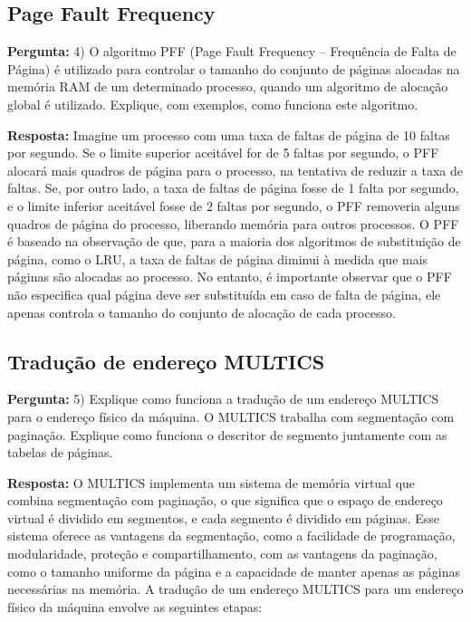 \documentclass{article}
\begin{document}
\subsection{Page Fault Frequency}

\textbf{Pergunta:} 4) O algoritmo PFF (Page Fault Frequency – Frequência de Falta de Página) é utilizado para controlar o tamanho do conjunto de páginas alocadas na memória RAM de um determinado processo, quando um algoritmo de alocação global é utilizado. Explique, com exemplos, como funciona este algoritmo.  \newline

\textbf{Resposta:} Imagine um processo com uma taxa de faltas de página de 10 faltas por segundo. Se o limite superior aceitável for de 5 faltas por segundo, o PFF alocará mais quadros de página para o processo, na tentativa de reduzir a taxa de faltas. Se, por outro lado, a taxa de faltas de página fosse de 1 falta por segundo, e o limite inferior aceitável fosse de 2 faltas por segundo, o PFF removeria alguns quadros de página do processo, liberando memória para outros processos.
O PFF é baseado na observação de que, para a maioria dos algoritmos de substituição de página, como o LRU, a taxa de faltas de página diminui à medida que mais páginas são alocadas ao processo. No entanto, é importante observar que o PFF não especifica qual página deve ser substituída em caso de falta de página, ele apenas controla o tamanho do conjunto de alocação de cada processo.

\subsection{Tradução de endereço MULTICS}

\textbf{Pergunta:} 5) Explique como funciona a tradução de um endereço MULTICS para o endereço físico da máquina. O MULTICS trabalha com segmentação com paginação. Explique como funciona o descritor de segmento juntamente com as tabelas de páginas. \textcite[p. 170]{tanenbaum2021}   \newline

\textbf{Resposta:} O MULTICS implementa um sistema de memória virtual que combina segmentação com paginação, o que significa que o espaço de endereço virtual é dividido em segmentos, e cada segmento é dividido em páginas. Esse sistema oferece as vantagens da segmentação, como a facilidade de programação, modularidade, proteção e compartilhamento, com as vantagens da paginação, como o tamanho uniforme da página e a capacidade de manter apenas as páginas necessárias na memória.
A tradução de um endereço MULTICS para um endereço físico da máquina envolve as seguintes etapas:
\end{document}
